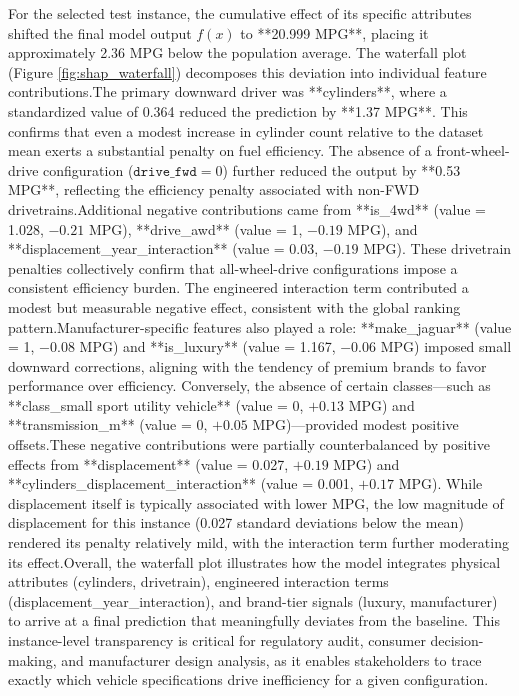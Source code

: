 For the selected test instance, the cumulative effect of its specific attributes shifted the final model output \(f(x)\) to **20.999 MPG**, placing it approximately 2.36 MPG below the population average. The waterfall plot (Figure \ref{fig:shap_waterfall})\cite{atique2026explainable} decomposes this deviation into individual feature contributions.The primary downward driver was **cylinders**, where a standardized value of 0.364 reduced the prediction by **1.37 MPG**. This confirms that even a modest increase in cylinder count relative to the dataset mean exerts a substantial penalty on fuel efficiency. The absence of a front-wheel-drive configuration (\(\texttt{drive\_fwd} = 0\)) further reduced the output by **0.53 MPG**, reflecting the efficiency penalty associated with non-FWD drivetrains.Additional negative contributions came from **is\_4wd** (value = 1.028, \(-0.21\) MPG), **drive\_awd** (value = 1, \(-0.19\) MPG), and **displacement\_year\_interaction** (value = 0.03, \(-0.19\) MPG). These drivetrain penalties collectively confirm that all-wheel-drive configurations impose a consistent efficiency burden. The engineered interaction term contributed a modest but measurable negative effect, consistent with the global ranking pattern.Manufacturer-specific features also played a role: **make\_jaguar** (value = 1, \(-0.08\) MPG) and **is\_luxury** (value = 1.167, \(-0.06\) MPG) imposed small downward corrections, aligning with the tendency of premium brands to favor performance over efficiency. Conversely, the absence of certain classes—such as **class\_small sport utility vehicle** (value = 0, \(+0.13\) MPG) and **transmission\_m** (value = 0, \(+0.05\) MPG)—provided modest positive offsets.These negative contributions were partially counterbalanced by positive effects from **displacement** (value = 0.027, \(+0.19\) MPG) and **cylinders\_displacement\_interaction** (value = 0.001, \(+0.17\) MPG). While displacement itself is typically associated with lower MPG, the low magnitude of displacement for this instance (0.027 standard deviations below the mean) rendered its penalty relatively mild, with the interaction term further moderating its effect.Overall, the waterfall plot illustrates how the model integrates physical attributes (cylinders, drivetrain), engineered interaction terms (displacement\_year\_interaction), and brand-tier signals (luxury, manufacturer) to arrive at a final prediction that meaningfully deviates from the baseline. This instance-level transparency is critical for regulatory audit, consumer decision-making, and manufacturer design analysis, as it enables stakeholders to trace exactly which vehicle specifications drive inefficiency for a given configuration.



